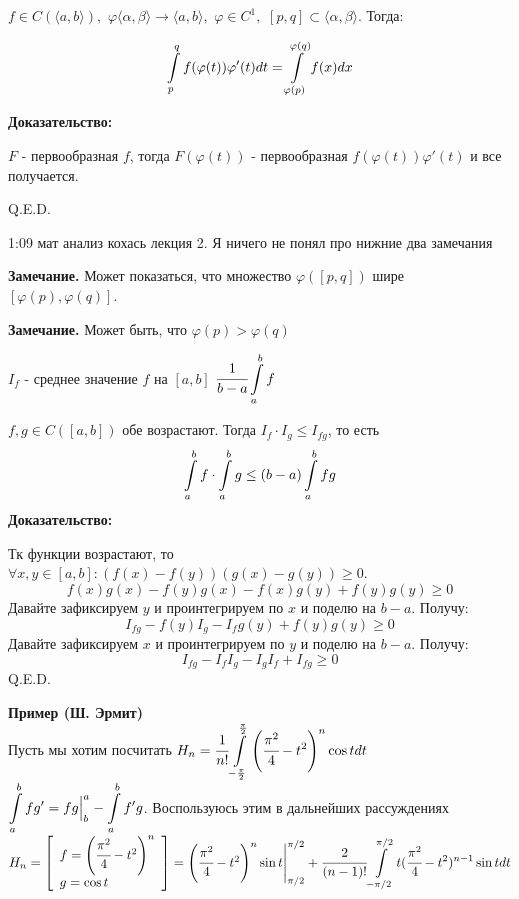
$f \in C(\langle a,b\rangle), \,\, \varphi\langle\alpha, \beta\rangle \rightarrow \langle a, b \rangle, \,\, \varphi \in C^1, \,\, [p,q] \subset \langle \alpha,\beta\rangle$. Тогда:

$$\displaystyle\int\limits_{p}^{q}f(\varphi(t))\varphi'(t)dt = \displaystyle\int\limits_{\varphi(p)}^{\varphi(q)}f(x)dx$$

\textbf{Доказательство:}

$F$ - первообразная $f$, тогда $F(\varphi(t))$ - первообразная $f(\varphi(t))\varphi'(t)$ и все получается.
 
 \hfill Q.E.D.

1:09 мат анализ кохась лекция 2. Я ничего не понял про нижние два замечания


 \textbf{Замечание.} Может показаться, что множество $\varphi([p,q])$ шире $[\varphi(p),\varphi(q)]$. 

 \textbf{Замечание.} Может быть, что $\varphi(p) > \varphi(q)$

$I_f$ - среднее значение $f$  на $[a,b]$  $\cfrac{1}{b-a}\displaystyle\int\limits_{a}^{b}f$
 

 $f,g \in C([a,b])$ обе возрастают. Тогда $I_f \cdot I_g \leq I_{fg}$, то есть
$$\displaystyle\int\limits_{a}^{b}f \cdot \displaystyle\int\limits_{a}^{b}g\leq (b-a)\displaystyle\int\limits_{a}^{b}fg$$
\textbf{Доказательство:}

Тк функции возрастают, то $\forall x,y \in [a,b]: (f(x)-f(y))(g(x) - g(y))\geq 0$.
$$f(x)g(x)-f(y)g(x)-f(x)g(y) + f(y)g(y) \geq 0$$ 
Давайте зафиксируем $y$ и проинтегрируем по $x$ и поделю на $b-a$. Получу:
$$I_{fg} - f(y) I_g - I_f g(y) + f(y)g(y)\geq 0 $$
Давайте зафиксируем $x$ и проинтегрируем по $y$ и поделю на $b-a$. Получу:
$$I_{fg}-I_fI_g -I_gI_f + I_{fg} \geq 0$$
\hfill Q.E.D.

\textbf{Пример (Ш. Эрмит)} \\
Пусть мы хотим посчитать $H_n = \cfrac{1}{n!}\displaystyle\int\limits_{-\frac{\pi}{2}}^{\frac{\pi}{2}} \left(\cfrac{\pi^2}{4}-t^2\right)^n \cos t dt$\\
$\displaystyle\int\limits_{a}^{b}fg' = fg\Big|^a_b - \displaystyle\int\limits_{a}^{b}f'g$. Воспользуюсь этим в дальнейших рассуждениях\\
$H_n =\left [ \begin{array}{l}
    f = \left(\cfrac{\pi^2}{4}-t^2\right)^n\\  
     g = \cos t 
\end{array}\right] =\left(\cfrac{\pi^2}{4}-t^2\right)^n \sin t\Bigg|^{\pi/2}_{\pi/2} + \cfrac{2}{(n-1)!}\displaystyle\int\limits_{-\pi/2}^{\pi/2}t(\cfrac{\pi^2}{4}-t^2)^{n-1}\sin t dt $

